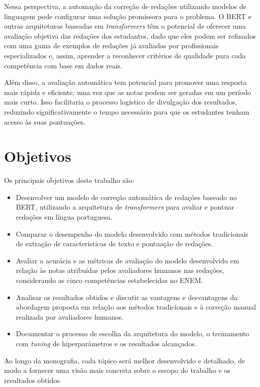 Nessa perspectiva, a automação da correção de redações utilizando modelos de linguagem pode configurar uma solução promissora para o problema. O BERT e outras arquiteturas baseadas em \textit{transformers} têm o potencial de oferecer uma avaliação objetiva das redações dos estudantes, dado que eles podem ser refinados com uma gama de exemplos de redações já avaliadas por profissionais especializados e, assim, aprender a reconhecer critérios de qualidade para cada competência com base em dados reais.

Além disso, a avaliação automática tem potencial para promover uma resposta mais rápida e eficiente, uma vez que as notas podem ser geradas em um período mais curto. Isso facilitaria o processo logístico de divulgação dos resultados, reduzindo significativamente o tempo necessário para que os estudantes tenham acesso às suas pontuações.

\section{Objetivos}

Os principais objetivos deste trabalho são:

\begin{itemize}
    \item Desenvolver um modelo de correção automática de redações baseado no BERT, utilizando a arquitetura de \textit{transformers} para avaliar e pontuar redações em língua portuguesa.
    \item Comparar o desempenho do modelo desenvolvido com métodos tradicionais de extração de características de texto e pontuação de redações.
    \item Avaliar a acurácia e as métricas de avaliação do modelo desenvolvido em relação às notas atribuídas pelos avaliadores humanos nas redações, considerando as cinco competências estabelecidas no ENEM.
    \item Analisar os resultados obtidos e discutir as vantagens e desvantagens da abordagem proposta em relação aos métodos tradicionais e à correção manual realizada por avaliadores humanos.
    \item Documentar o processo de escolha da arquitetura do modelo, o treinamento com \textit{tuning} de hiperparâmetros e os resultados alcançados.
\end{itemize}

Ao longo da monografia, cada tópico será melhor desenvolvido e detalhado, de modo a fornecer uma visão mais concreta sobre o escopo do trabalho e os resultados obtidos.
